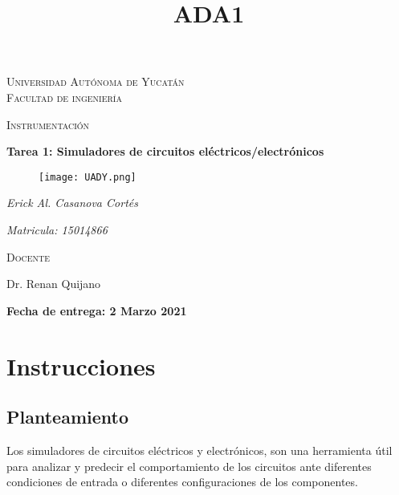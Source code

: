 \documentclass[11pt]{report}
\theoremstyle{plain}
\theoremstyle{definition}
\begin{document}
\begin{titlepage}
\title{ADA1}


	\centering
	{\scshape\LARGE Universidad Autónoma de Yucatán  \\ Facultad de ingeniería\par}
	\vspace{1cm}
	{\scshape\Large Instrumentación\par}
	\vspace{1.5cm}
	{\huge\bfseries Tarea 1: Simuladores de circuitos eléctricos/electrónicos\par}
	\vspace{0.7cm}
	{\begin{figure}[!h]
	\centering
    \texttt{[image: UADY.png]}
	\end{figure}}
	\vspace{0.7cm}
	{\Large\itshape Erick Al. Casanova Cortés\par}
	{\Large\itshape Matricula: 15014866\par}
	\vfill
	{\scshape\Large Docente\par
	Dr. Renan Quijano\par}
	\vfill
	{\Large{\bfseries Fecha de entrega: 2 Marzo 2021} }

	\vfill
	
\end{titlepage}


\tableofcontents


\chapter{Instrucciones}



\section{Planteamiento}

Los simuladores de circuitos eléctricos y electrónicos, son una herramienta útil para analizar y predecir el comportamiento de los circuitos ante diferentes condiciones de entrada o diferentes configuraciones de los componentes.
\end{document}
